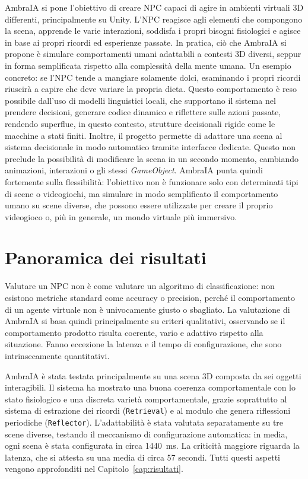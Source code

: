 AmbraIA si pone l'obiettivo di creare NPC capaci di agire in ambienti virtuali 3D differenti, principalmente su Unity. L'NPC reagisce agli elementi che compongono la scena, apprende le varie interazioni, soddisfa i propri bisogni fisiologici e agisce in base ai propri ricordi ed esperienze passate. In pratica, ciò che AmbraIA si propone è simulare comportamenti umani adattabili a contesti 3D diversi, seppur in forma semplificata rispetto alla complessità della mente umana. Un esempio concreto: se l'NPC tende a mangiare solamente dolci, esaminando i propri ricordi riuscirà a capire che deve variare la propria dieta. Questo comportamento è reso possibile dall'uso di modelli linguistici locali, che supportano il sistema nel prendere decisioni, generare codice dinamico e riflettere sulle azioni passate, rendendo superflue, in questo contesto, strutture decisionali rigide come le macchine a stati finiti. Inoltre, il progetto permette di adattare una scena al sistema decisionale in modo automatico tramite interfacce dedicate. Questo non preclude la possibilità di modificare la scena in un secondo momento, cambiando animazioni, interazioni o gli stessi \textit{GameObject}. AmbraIA punta quindi fortemente sulla flessibilità: l'obiettivo non è funzionare solo con determinati tipi di scene o videogiochi, ma simulare in modo semplificato il comportamento umano su scene diverse, che possono essere utilizzate per creare il proprio videogioco o, più in generale, un mondo virtuale più immersivo.

\section{Panoramica dei risultati}

Valutare un NPC non è come valutare un algoritmo di classificazione: non esistono metriche standard come accuracy o precision, perché il comportamento di un agente virtuale non è univocamente giusto o sbagliato. La valutazione di AmbraIA si basa quindi principalmente su criteri qualitativi, osservando se il comportamento prodotto risulta coerente, vario e adattivo rispetto alla situazione. Fanno eccezione la latenza e il tempo di configurazione, che sono intrinsecamente quantitativi.

AmbraIA è stata testata principalmente su una scena 3D composta da sei oggetti interagibili. Il sistema ha mostrato una buona coerenza comportamentale con lo stato fisiologico e una discreta varietà comportamentale, grazie soprattutto al sistema di estrazione dei ricordi (\texttt{Retrieval}) e al modulo che genera riflessioni periodiche (\texttt{Reflector}). L'adattabilità è stata valutata separatamente su tre scene diverse, testando il meccanismo di configurazione automatica: in media, ogni scena è stata configurata in circa 1440~ms. La criticità maggiore riguarda la latenza, che si attesta su una media di circa 57 secondi. Tutti questi aspetti vengono approfonditi nel Capitolo~\ref{cap:risultati}.

